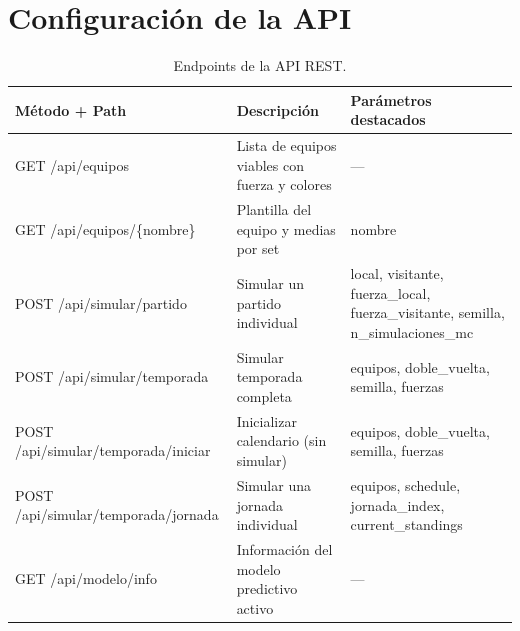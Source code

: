 \chapter{Configuraci\'on de la API}
\label{app:api}

\begin{table}[htbp]
\centering
\caption{Endpoints de la API REST.}
\label{tab:api-endpoints}
\begin{tabular}{@{}lll@{}}
\toprule
\textbf{M\'etodo + Path} & \textbf{Descripci\'on} & \textbf{Par\'ametros destacados} \\
\midrule
GET /api/equipos & Lista de equipos viables con fuerza y colores & --- \\
GET /api/equipos/\{nombre\} & Plantilla del equipo y medias por set & nombre \\
POST /api/simular/partido & Simular un partido individual & local, visitante, fuerza\_local, fuerza\_visitante, semilla, n\_simulaciones\_mc \\
POST /api/simular/temporada & Simular temporada completa & equipos, doble\_vuelta, semilla, fuerzas \\
POST /api/simular/temporada/iniciar & Inicializar calendario (sin simular) & equipos, doble\_vuelta, semilla, fuerzas \\
POST /api/simular/temporada/jornada & Simular una jornada individual & equipos, schedule, jornada\_index, current\_standings \\
GET /api/modelo/info & Informaci\'on del modelo predictivo activo & --- \\
\bottomrule
\end{tabular}
\end{table}

